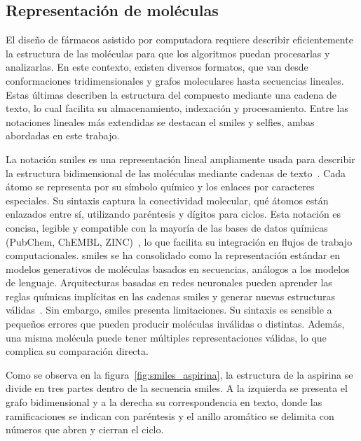 \subsection{Representación de moléculas}
\label{subsec:rep_moleculas}

El diseño de fármacos asistido por computadora requiere describir eficientemente la estructura de las moléculas para que los algoritmos puedan procesarlas y analizarlas. En este contexto, existen diversos formatos, que van desde conformaciones tridimensionales y grafos moleculares hasta secuencias lineales. Estas últimas describen la estructura del compuesto mediante una cadena de texto, lo cual facilita su almacenamiento, indexación y procesamiento. Entre las notaciones lineales más extendidas se destacan el \gls{smiles} y \gls{selfies}, ambas abordadas en este trabajo. 

La notación \gls{smiles} es una representación lineal ampliamente usada para describir la estructura bidimensional de las moléculas mediante cadenas de texto~\cite{weininger1988smiles}. Cada átomo se representa por su símbolo químico y los enlaces por caracteres especiales. Su sintaxis captura la conectividad molecular, qué átomos están enlazados entre sí, utilizando paréntesis y dígitos para ciclos. Esta notación es concisa, legible y compatible con la mayoría de las bases de datos químicas (PubChem, ChEMBL, ZINC)~\cite{bolton2008pubchem, mendez2019chembl, irwin2020zinc20}, lo que facilita su integración en flujos de trabajo computacionales. \Gls{smiles} se ha consolidado como la representación estándar en modelos generativos de moléculas basados en secuencias, análogos a los modelos de lenguaje. Arquitecturas basadas en redes neuronales pueden aprender las reglas químicas implícitas en las cadenas \gls{smiles} y generar nuevas estructuras válidas~\cite{Kong2022SMILES, Segler2018Generating, Olivecrona2017Molecular}. Sin embargo, \gls{smiles} presenta limitaciones. Su sintaxis es sensible a pequeños errores que pueden producir moléculas inválidas o distintas. Además, una misma molécula puede tener múltiples representaciones válidas, lo que complica su comparación directa. 

Como se observa en la figura~\ref{fig:smiles_aspirina}, la estructura de la aspirina se divide en tres partes dentro de la secuencia \gls{smiles}. A la izquierda se presenta el grafo bidimensional y a la derecha su correspondencia en texto, donde las ramificaciones se indican con paréntesis y el anillo aromático se delimita con números que abren y cierran el ciclo.

